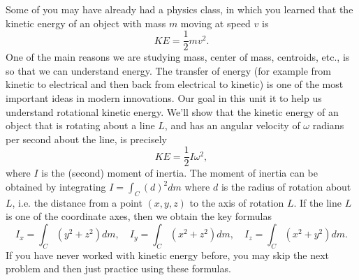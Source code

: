 Some of you may have already had a physics class, in which you learned that the kinetic energy of an object with mass $m$ moving at speed $v$ is $$KE = \frac{1}{2}mv^2.$$
One of the main reasons we are studying mass, center of mass, centroids, etc., is so that we can understand energy. The transfer of energy (for example from kinetic to electrical and then back from electrical to kinetic) is one of the most important ideas in modern innovations. Our goal in this unit it to help us understand rotational kinetic energy. We'll show that the kinetic energy of an object that is rotating about a line $L$, and has an angular velocity of $\omega$ radians per second about the line, is precisely $$KE = \frac{1}{2}I \omega^2,$$
where $I$ is the (second) moment of inertia. The moment of inertia can be obtained by integrating $I=\int_C (d)^2 dm$ where $d$ is the radius of rotation about $L$, i.e. the distance from a point $(x,y,z)$ to the axis of rotation $L$. If the line $L$ is one of the coordinate axes, then we obtain the key formulas 
$$
I_x = \int_C (y^2+z^2)dm,\quad
I_y = \int_C (x^2+z^2)dm,\quad
I_z = \int_C (x^2+y^2)dm
.$$
If you have never worked with kinetic energy before, you may skip the next problem and then just practice using these formulas.

